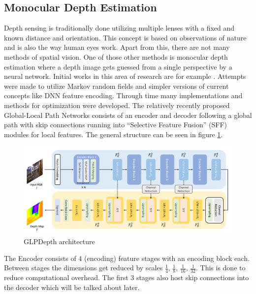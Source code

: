 \subsection{Monocular Depth Estimation}

Depth sensing is traditionally done utilizing multiple lenses with a fixed and known distance and orientation. This concept is based on observations of nature and is also the way human eyes work.
Apart from this, there are not many methods of spatial vision. One of those other methods is monocular depth estimation where a depth image gets guessed from a single perspective by a neural network. Initial works in this area of research are for example \cite{Saxena} \cite{Eigen} \cite{Huynh} \cite{Yin}. Attempts were made to utilize Markov random fields and simpler versions of current concepts like DNN feature encoding.
Through time many implementations and methods for optimization were developed. The relatively recently \cite{kim2022global} proposed Global-Local Path Networks consists of an encoder and decoder following a global path with skip connections running into \enquote{Selective Feature Fusion} (SFF) modules for local features. The general structure can be seen in figure \ref*{GLPDepth_arch}.

\begin{figure}[ht]
    \begin{center}
        \includegraphics*[scale=.22, pagebox=artbox]{resources/GLPDepth.png}
        \caption{GLPDepth architecture \cite{kim2022global}} \label{GLPDepth_arch}
    \end{center}
\end{figure}

The Encoder consists of 4 (encoding) feature stages with an encoding block each. Between stages the dimensions get reduced by scales $\frac{1}{4}$, $\frac{1}{8}$, $\frac{1}{16}$, $\frac{1}{32}$. This is done to reduce computational overhead. The first 3 stages also host skip connections into the decoder which will be talked about later.

